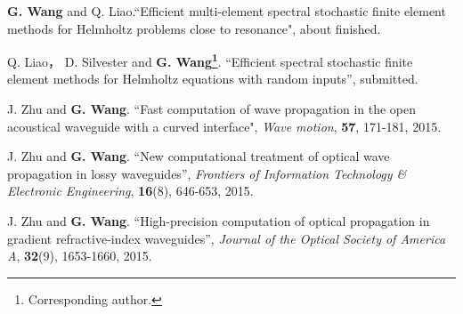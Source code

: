 \begin{publications}{99}
\item  {\bf G. Wang} and Q. Liao.``Efficient multi-element spectral stochastic finite element methods for Helmholtz problems close to resonance", about finished.
\item  Q. Liao， D. Silvester and {\bf G. Wang\footnote[1]{Corresponding author.}}. ``Efficient spectral stochastic finite element methods for Helmholtz equations with random inputs'', submitted.
\item J. Zhu and {\bf G. Wang}. ``Fast computation of wave propagation in the open acoustical waveguide with a curved interface",  {\em Wave motion}, {\bf 57}, 171-181, 2015.
\item J. Zhu and {\bf G. Wang}. ``New computational treatment of optical wave propagation in lossy waveguides'',  {\em Frontiers of Information Technology \& Electronic Engineering}, {\bf 16}(8), 646-653, 2015.
\item  J. Zhu and {\bf G. Wang}. ``High-precision computation of optical propagation in gradient refractive-index waveguides'',  {\em Journal of the Optical Society of America A}, {\bf 32}(9), 1653-1660, 2015.

\end{publications}